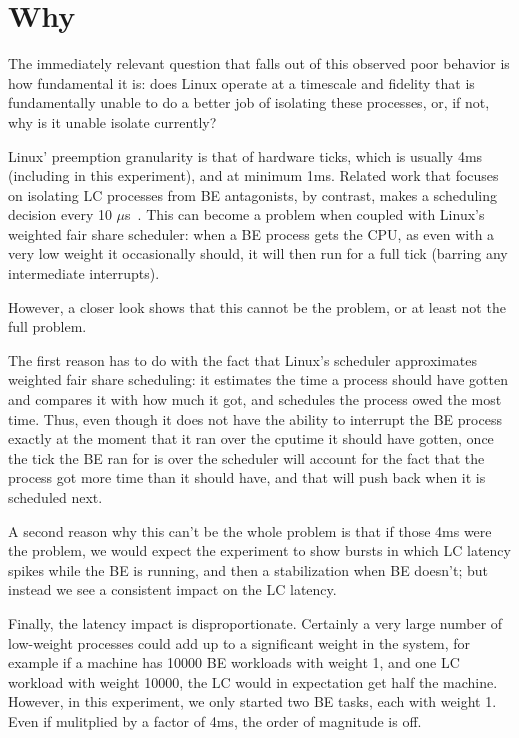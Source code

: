 
\chapter{Why}


The immediately relevant question that falls out of this observed poor behavior
is how fundamental it is: does Linux operate at a timescale and fidelity that is
fundamentally unable to do a better job of isolating these processes, or, if
not, why is it unable isolate currently?

Linux' preemption granularity is that of hardware ticks, which is usually 4ms
(including in this experiment), and at minimum 1ms. Related work that focuses on
isolating LC processes from BE antagonists, by contrast, makes a scheduling
decision every 10 $\mu$s~\cite{TODO}. This can become a problem when coupled
with Linux's weighted fair share scheduler: when a BE process gets the CPU, as
even with a very low weight it occasionally should, it will then run for a full
tick (barring any intermediate interrupts).

However, a closer look shows that this cannot be the problem, or at least not
the full problem. 

The first reason has to do with the fact that Linux's scheduler approximates
weighted fair share scheduling: it estimates the time a process should have
gotten and compares it with how much it got, and schedules the process owed the
most time. Thus, even though it does not have the ability to interrupt the BE
process exactly at the moment that it ran over the cputime it should have
gotten, once the tick the BE ran for is over the scheduler will account for the
fact that the process got more time than it should have, and that will push back
when it is scheduled next. 

A second reason why this can't be the whole problem is that if those 4ms were
the problem, we would expect the experiment to show bursts in which LC latency
spikes while the BE is running, and then a stabilization when BE doesn't; but
instead we see a consistent impact on the LC latency.

Finally, the latency impact is disproportionate. Certainly a very large number
of low-weight processes could add up to a significant weight in the system, for
example if a machine has 10000 BE workloads with weight 1, and one LC workload
with weight 10000, the LC would in expectation get half the machine. However, in
this experiment, we only started two BE tasks, each with weight 1. Even if
mulitplied by a factor of 4ms, the order of magnitude is off.


